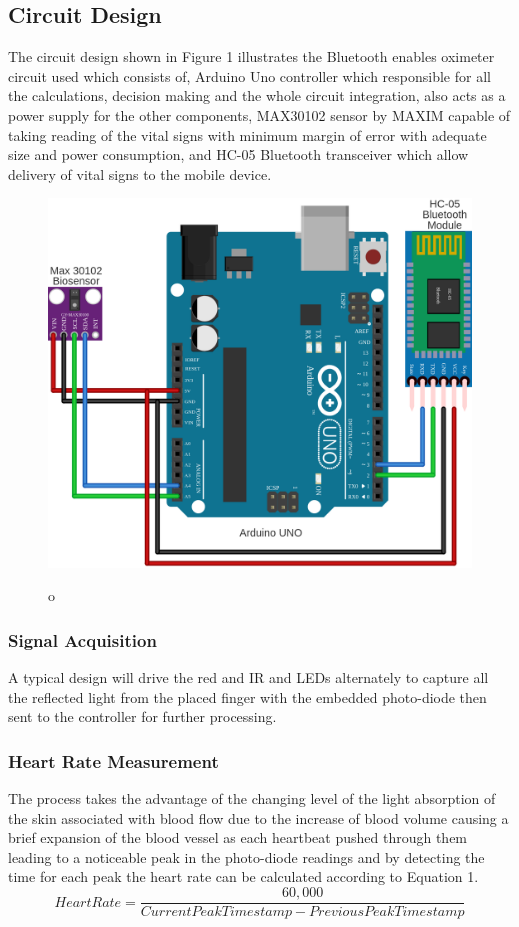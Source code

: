 \documentclass{bmcart}
\begin{document}
\subsection*{Circuit Design}
The circuit design shown in Figure 1 illustrates the Bluetooth enables oximeter
circuit used which consists of,  Arduino Uno controller which responsible for
all the calculations, decision making and the whole circuit integration, also
acts as a power supply for the other components, MAX30102 sensor by MAXIM
capable of taking reading of the vital signs with minimum margin of error with
adequate size and power consumption, and  HC-05 Bluetooth transceiver which
allow delivery of vital signs to the mobile device.

\begin{figure}[h!]
  \includegraphics[width=.75\linewidth]{png_images/circuit_desing.png}
  \caption{
      }o
\end{figure}
\FloatBarrier

\subsubsection*{Signal Acquisition}
A typical design will drive the red and IR and LEDs alternately to capture all
the reflected light from the placed finger with the embedded photo-diode then
sent to the controller for further processing.\\

\subsubsection*{Heart Rate Measurement}
The process takes the advantage of the changing level of the light absorption of
the skin associated with blood flow due to the increase of blood volume causing
a brief expansion of the blood vessel as each heartbeat pushed through them
leading to a noticeable peak in the photo-diode readings and by detecting the
time for each peak the heart rate can be calculated according to Equation 1.\\
%
\[
 Heart Rate = \frac{60,000}{Current Peak Timestamp - Previous Peak Timestamp}
 \tag{1}
\]
%
\end{document}

